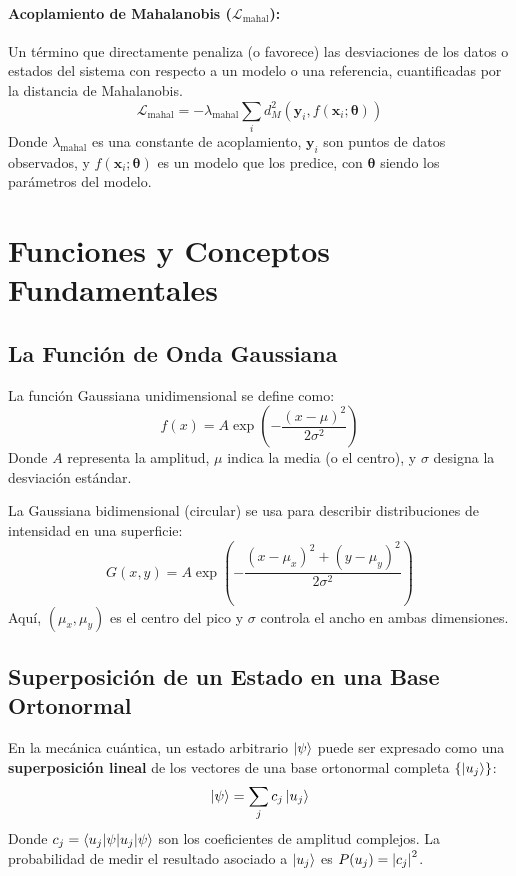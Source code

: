 \documentclass{book}
\begin{document}
\paragraph{Acoplamiento de Mahalanobis ($\mathcal{L}_{\text{mahal}}$):} Un término que directamente penaliza (o favorece) las desviaciones de los datos o estados del sistema con respecto a un modelo o una referencia, cuantificadas por la distancia de Mahalanobis.
\begin{equation}
    \mathcal{L}_{\text{mahal}}=-\lambda_{\text{mahal}}\sum_i d_M^2(\mathbf{y}_i,f(\mathbf{x}_i;\boldsymbol{\theta}))
\end{equation}
Donde $\lambda_{\text{mahal}}$ es una constante de acoplamiento, $\mathbf{y}_i$ son puntos de datos observados, y $f(\mathbf{x}_i;\boldsymbol{\theta})$ es un modelo que los predice, con $\boldsymbol{\theta}$ siendo los parámetros del modelo.

\section{Funciones y Conceptos Fundamentales}

\subsection{La Función de Onda Gaussiana}
La función Gaussiana unidimensional se define como:
\begin{equation}
    f(x) = A \exp\left(-\frac{(x - \mu)^2}{2\sigma^2}\right)
    \label{eq:gaussiana1D}
\end{equation}
Donde $A$ representa la amplitud, $\mu$ indica la media (o el centro), y $\sigma$ designa la desviación estándar. 

La Gaussiana bidimensional (circular) se usa para describir distribuciones de intensidad en una superficie:
\begin{equation}
    G(x, y) = A \exp\left(-\frac{(x - \mu_x)^2 + (y - \mu_y)^2}{2\sigma^2}\right)
    \label{eq:gaussiana2D}
\end{equation}
Aquí, $(\mu_x, \mu_y)$ es el centro del pico y $\sigma$ controla el ancho en ambas dimensiones.

\subsection{Superposición de un Estado en una Base Ortonormal}
\label{sec:superposicion_base}
En la mecánica cuántica, un estado arbitrario $\ket{\psi}$ puede ser expresado como una \textbf{superposición lineal} de los vectores de una base ortonormal completa $\{\ket{u_j}\}$:
\begin{equation}
    \ket{\psi} = \sum_{j} c_j \ket{u_j}
    \label{eq:superposicion_general}
\end{equation}
Donde $c_j = \braket{u_j | \psi}$ son los coeficientes de amplitud complejos. La probabilidad de medir el resultado asociado a $\ket{u_j}$ es $P(u_j) = \abs{c_j}^2$.
\end{document}
